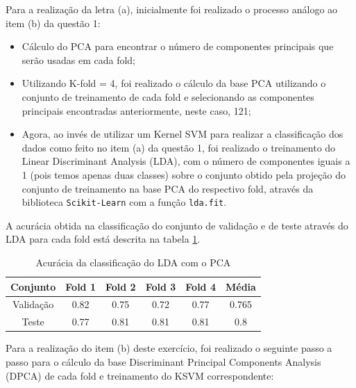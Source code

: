 \documentclass[]{abntex2}
\begin{document}
Para a realização da letra (a), inicialmente foi realizado o processo análogo ao item (b) da questão 1: 
\begin{itemize}
    \item Cálculo do PCA para encontrar o número de componentes principais que serão usadas em cada fold;
    \item Utilizando K-fold = 4, foi realizado o cálculo da base PCA utilizando o conjunto de treinamento de cada fold e selecionando as componentes principais encontradas anteriormente, neste caso, 121;
    \item Agora, ao invés de utilizar um Kernel SVM para realizar a classificação dos dados como feito no item (a) da questão 1, foi realizado o treinamento do Linear Discriminant Analysis (LDA), com o número de componentes iguais a 1 (pois temos apenas duas classes) sobre o conjunto obtido pela projeção do conjunto de treinamento na base PCA do respectivo fold, através da biblioteca \texttt{Scikit-Learn} com a função \texttt{lda.fit}.

\end{itemize}

A acurácia obtida na classificação do conjunto de validação e de teste através do LDA para cada fold está descrita na tabela \ref{tab:lda_clas}.

\begin{table}[H]
    \centering
    \begin{tabular}{|c|c|c|c|c|c|}
    \hline
    \rowcolor[HTML]{C0C0C0} 
    Conjunto                          & Fold 1 & Fold 2 & Fold 3 & Fold 4 & Média  \\ \hline
    \cellcolor[HTML]{C0C0C0}Validação & 0.82   & 0.75  & 0.72   & 0.77   & 0.765  \\ \hline
    \cellcolor[HTML]{C0C0C0}Teste     & 0.77   & 0.81   & 0.81   & 0.81   & 0.8 \\ \hline
    \end{tabular}
    \caption{Acurácia da classificação do LDA com o PCA}
    \label{tab:lda_clas}
\end{table}

Para a realização do item (b) deste exercício, foi realizado o seguinte passo a passo para o cálculo da base Discriminant Principal Components Analysis (DPCA) de cada fold e treinamento do KSVM correspondente:
\end{document}
